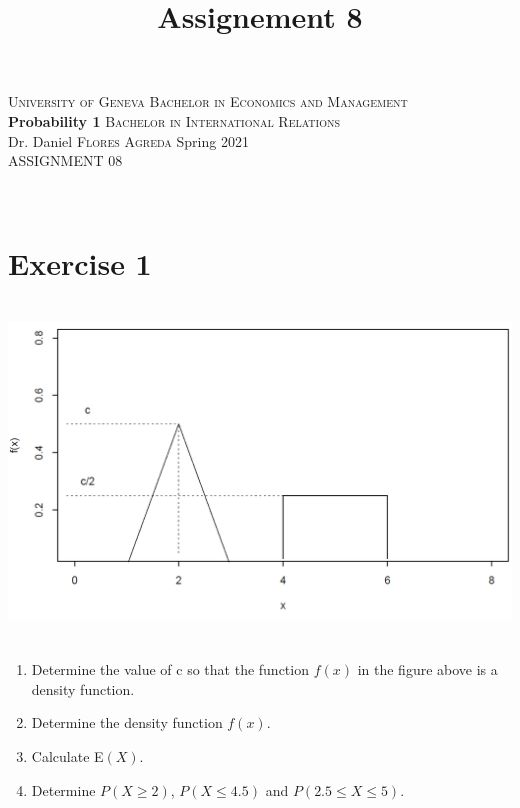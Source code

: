 \documentclass[12pt,thmsa]{article}\usepackage[]{graphicx}\usepackage[]{color}
\title{Assignement 8}
\begin{document}
\noindent \textsc{University of Geneva}     \hfill \textsc{Bachelor in Economics and Management} \\
\textbf{Probability 1}                      \hfill \textsc{Bachelor in International Relations} \\
Dr. Daniel \textsc{Flores Agreda}                 \hfill Spring 2021  \\
ASSIGNMENT 08



\noindent
\makebox[\linewidth]{\rule{\textwidth}{0.4pt}}\\[1.5ex]

\section*{Exercise 1}
\centerline{\includegraphics[height=9cm]{figure.png}}
\bigskip

\begin{enumerate}%
\item Determine the value of c so that the function $f(x)$ in the figure above is a density function. %

\item Determine the density function $f(x)$.
\item Calculate E$(X)$.
\item Determine $P(X \geq 2)$, $P(X \leq 4.5)$ and $P(2.5 \leq X \leq
5)$.
\end{enumerate}
\end{document}

